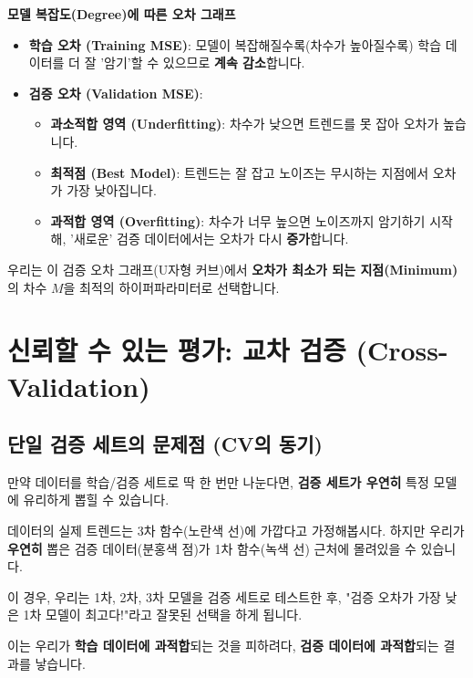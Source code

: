 \documentclass[11pt,a4paper]{book}
\theoremstyle{definition}
\begin{document}
\textbf{모델 복잡도(Degree)에 따른 오차 그래프}
\begin{itemize}
    \item \textbf{학습 오차 (Training MSE)}: 모델이 복잡해질수록(차수가 높아질수록) 학습 데이터를 더 잘 '암기'할 수 있으므로 \textbf{계속 감소}합니다.
    \item \textbf{검증 오차 (Validation MSE)}:
        \begin{itemize}
            \item \textbf{과소적합 영역 (Underfitting)}: 차수가 낮으면 트렌드를 못 잡아 오차가 높습니다.
            \item \textbf{최적점 (Best Model)}: 트렌드는 잘 잡고 노이즈는 무시하는 지점에서 오차가 가장 낮아집니다.
            \item \textbf{과적합 영역 (Overfitting)}: 차수가 너무 높으면 노이즈까지 암기하기 시작해, '새로운' 검증 데이터에서는 오차가 다시 \textbf{증가}합니다.
        \end{itemize}
\end{itemize}
우리는 이 검증 오차 그래프(U자형 커브)에서 \textbf{오차가 최소가 되는 지점(Minimum)}의 차수 $M$을 최적의 하이퍼파라미터로 선택합니다.


\section{신뢰할 수 있는 평가: 교차 검증 (Cross-Validation)}

\subsection{단일 검증 세트의 문제점 (CV의 동기)}

만약 데이터를 학습/검증 세트로 딱 한 번만 나눈다면, \textbf{검증 세트가 우연히} 특정 모델에 유리하게 뽑힐 수 있습니다.

\begin{examplebox}[title=단일 검증 세트의 함정]
데이터의 실제 트렌드는 3차 함수(노란색 선)에 가깝다고 가정해봅시다.
하지만 우리가 \textbf{우연히} 뽑은 검증 데이터(분홍색 점)가 1차 함수(녹색 선) 근처에 몰려있을 수 있습니다.

이 경우, 우리는 1차, 2차, 3차 모델을 검증 세트로 테스트한 후, "검증 오차가 가장 낮은 1차 모델이 최고다!"라고 잘못된 선택을 하게 됩니다.

이는 우리가 \textbf{학습 데이터에 과적합}되는 것을 피하려다, \textbf{검증 데이터에 과적합}되는 결과를 낳습니다.
\end{examplebox}
\end{document}
